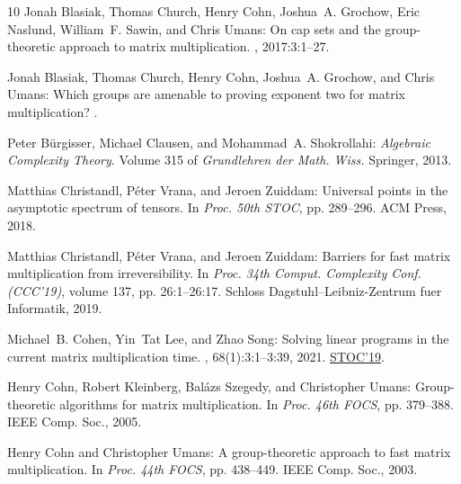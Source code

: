 \documentclass[11pt]{article}
\numberwithin{equation}{section}
\theoremstyle{definition}
\theoremstyle{plain}
\theoremstyle{definition}
\begin{document}
\begin{thebibliography}{10}
{\sc Jonah Blasiak, Thomas Church, Henry Cohn, Joshua~A. Grochow, Eric Naslund,
  William~F. Sawin, and Chris Umans}: On cap sets and the group-theoretic
  approach to matrix multiplication.
, 2017:3:1--27.
\newblock [\epfmtdoi{10.19086/da.1245}]

{\sc Jonah Blasiak, Thomas Church, Henry Cohn, Joshua~A. Grochow, and Chris
  Umans}: Which groups are amenable to proving exponent two for matrix
  multiplication?
.

{\sc Peter B{\"u}rgisser, Michael Clausen, and Mohammad~A. Shokrollahi}: {\em
  Algebraic Complexity Theory}.
\newblock Volume 315 of {\em Grundlehren der Math. Wiss.}
\newblock Springer, 2013.

{\sc Matthias Christandl, P{\'e}ter Vrana, and Jeroen Zuiddam}: Universal
  points in the asymptotic spectrum of tensors.
\newblock In {\em Proc. 50th STOC}, pp. 289--296. ACM Press, 2018.
\newblock [\epfmtdoi{10.1145/3188745.3188766}]

{\sc Matthias Christandl, P{\'{e}}ter Vrana, and Jeroen Zuiddam}: Barriers for
  fast matrix multiplication from irreversibility.
\newblock In {\em Proc. 34th Comput. Complexity Conf. (CCC'19)}, volume 137,
  pp. 26:1--26:17. Schloss Dagstuhl--Leibniz-Zentrum fuer Informatik, 2019.

{\sc Michael~B. Cohen, Yin~Tat Lee, and Zhao Song}: Solving linear programs in
  the current matrix multiplication time.
, 68(1):3:1--3:39, 2021.
\newblock \prelim \href{https://doi.org/10.1145/3313276.3316303}{STOC'19}.
\newblock [\epfmtdoi{10.1145/3424305}]

{\sc Henry Cohn, Robert Kleinberg, Bal{\'a}zs Szegedy, and Christopher Umans}:
  Group-theoretic algorithms for matrix multiplication.
\newblock In {\em Proc. 46th FOCS}, pp. 379--388. IEEE Comp. Soc., 2005.

{\sc Henry Cohn and Christopher Umans}: A group-theoretic approach to fast
  matrix multiplication.
\newblock In {\em Proc. 44th FOCS}, pp. 438--449. IEEE Comp. Soc., 2003.


\end{thebibliography}
\end{document}
